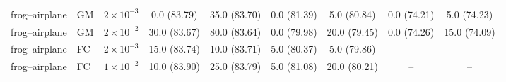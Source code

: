\begin{table}[t]
{\begin{tabular}{lllcccccc}
\midrule

frog--airplane & GM &
$2{\times}10^{-3}$ &
0.0 \small{(83.79)} & 35.0 \small{(83.70)} & 0.0 \small{(81.39)} & 5.0 \small{(80.84)} & 0.0 \small{(74.21)} & 5.0 \small{(74.23)} \\

frog--airplane & GM &
$2{\times}10^{-2}$ &
30.0 \small{(83.67)} & 80.0 \small{(83.64)} & 0.0 \small{(79.98)} & 20.0 \small{(79.45)} & 0.0 \small{(74.26)} & 15.0 \small{(74.09)} \\

frog--airplane & FC &
$2{\times}10^{-3}$ &
15.0 \small{(83.74)} & 10.0 \small{(83.71)} & 5.0 \small{(80.37)} & 5.0 \small{(79.86)} & -- & -- \\

frog--airplane & FC &
$1{\times}10^{-2}$ &
10.0 \small{(83.90)} & 25.0 \small{(83.79)} & 5.0 \small{(81.08)} & 20.0 \small{(80.21)} & -- & -- \\

\bottomrule
\end{tabular}
}
\end{table}

